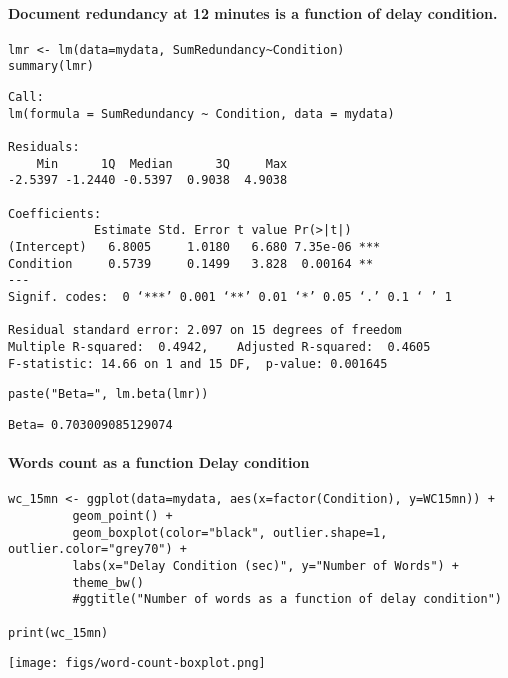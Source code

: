 \documentclass[10pt]{article}
\begin{document}
\paragraph*{Document redundancy at 12 minutes is a function of delay condition.}
\label{sec-2-2-1-3}

\begin{verbatim}
lmr <- lm(data=mydata, SumRedundancy~Condition)
summary(lmr)
\end{verbatim}

\begin{verbatim}
Call:
lm(formula = SumRedundancy ~ Condition, data = mydata)

Residuals:
    Min      1Q  Median      3Q     Max 
-2.5397 -1.2440 -0.5397  0.9038  4.9038 

Coefficients:
            Estimate Std. Error t value Pr(>|t|)    
(Intercept)   6.8005     1.0180   6.680 7.35e-06 ***
Condition     0.5739     0.1499   3.828  0.00164 ** 
---
Signif. codes:  0 ‘***’ 0.001 ‘**’ 0.01 ‘*’ 0.05 ‘.’ 0.1 ‘ ’ 1

Residual standard error: 2.097 on 15 degrees of freedom
Multiple R-squared:  0.4942,	Adjusted R-squared:  0.4605 
F-statistic: 14.66 on 1 and 15 DF,  p-value: 0.001645
\end{verbatim}

\begin{verbatim}
paste("Beta=", lm.beta(lmr))
\end{verbatim}

\begin{verbatim}
Beta= 0.703009085129074
\end{verbatim}



\paragraph*{Words count as a function Delay condition}
\label{sec-2-2-1-4}


\begin{verbatim}
wc_15mn <- ggplot(data=mydata, aes(x=factor(Condition), y=WC15mn)) +
	     geom_point() +
	     geom_boxplot(color="black", outlier.shape=1, outlier.color="grey70") +
	     labs(x="Delay Condition (sec)", y="Number of Words") +
	     theme_bw()
	     #ggtitle("Number of words as a function of delay condition")

print(wc_15mn)
\end{verbatim}

\texttt{[image: figs/word-count-boxplot.png]}
\end{document}
